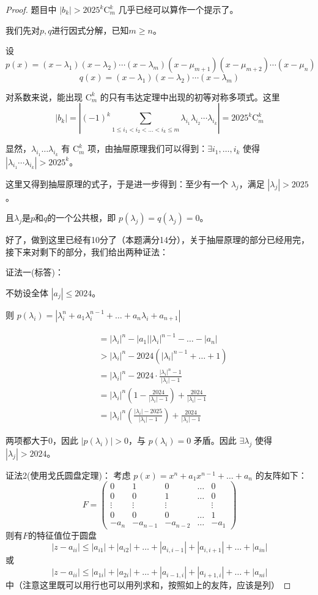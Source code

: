 \documentclass[12pt]{ctexart}  %
\begin{document}
\begin{proof}题目中 \(|b_k| > 2025^k \mathrm{C}_m^k\) 几乎已经可以算作一个提示了。

我们先对\(p,q\)进行因式分解，已知\(m \geq n\)。

设
\[
p(x) = (x-\lambda_1)(x-\lambda_2)\cdots(x-\lambda_m)(x-\mu_{m+1})(x-\mu_{m+2})\cdots(x-\mu_n)
\]
\[
q(x) = (x-\lambda_1)(x-\lambda_2)\cdots(x-\lambda_m)
\]

对系数来说，能出现 \(\mathrm{C}_m^k\) 的只有韦达定理中出现的初等对称多项式。这里
\[
|b_k| = \left|(-1)^k\sum_{1 \leq i_1 < i_2 < \dots < i_k \leq m} \lambda_{i_1}\lambda_{i_2}\cdots\lambda_{i_k}\right| = 2025^k \mathrm{C}_m^k
\]

显然，\(\lambda_{i_1} \dots \lambda_{i_k}\) 有 \(\mathrm{C}_m^k\) 项，由抽屉原理我们可以得到：\(\exists i_1,\dots,i_k\) 使得 \(|\lambda_{i_1}\cdots\lambda_{i_k}| > 2025^k\)。

这里又得到抽屉原理的式子，于是进一步得到：至少有一个 \(\lambda_j\)，满足 \(|\lambda_j| > 2025\)。

且\(\lambda_j\)是\(p\)和\(q\)的一个公共根，即 \(p(\lambda_j)=q(\lambda_j)=0\)。

好了，做到这里已经有10分了（本题满分14分），关于抽屉原理的部分已经用完，接下来对剩下的部分，我们给出两种证法：

证法一(标答)：

不妨设全体 \(|a_j| \leq 2024\)。

则 \(p(\lambda_i) = |\lambda_i^n + a_1\lambda_i^{n-1} + \dots + a_n\lambda_i + a_{n+1}|\)

\[
\begin{aligned}
&= |\lambda_i|^n - |a_1||\lambda_i|^{n-1} - \dots - |a_n| \\
&> |\lambda_i|^n - 2024 \left(|\lambda_i|^{n-1} + \dots + 1\right) \\
&= |\lambda_i|^n - 2024 \cdot \frac{|\lambda_i|^n - 1}{|\lambda_i| - 1} \\
&= |\lambda_i|^n \left(1 - \frac{2024}{|\lambda_i| - 1}\right) + \frac{2024}{|\lambda_i| - 1} \\
&= |\lambda_i|^n \left(\frac{|\lambda_i| - 2025}{|\lambda_i| - 1}\right) + \frac{2024}{|\lambda_i| - 1}
\end{aligned}
\]

两项都大于0，因此 \(|p(\lambda_i)| > 0\)，与 \(p(\lambda_i)=0\) 矛盾。因此 \(\exists \lambda_j\) 使得 \(|\lambda_j| > 2024\)。

证法2(使用戈氏圆盘定理)： 考虑 $p(x)=x^n+a_1x^{n-1}+\dots+a_n$ 的友阵如下：
\[
F = \begin{pmatrix}
0 & 1 & 0 & \dots & 0 \\
0 & 0 & 1 & \dots & 0 \\
\vdots & \vdots & \vdots & & \vdots \\
0 & 0 & 0 & \dots & 1 \\
-a_n & -a_{n-1} & -a_{n-2} & \dots & -a_1
\end{pmatrix}
\]
则有$F$的特征值位于圆盘
\[
|z - a_{ii}| \leq |a_{i1}| + |a_{i2}| + \dots + |a_{i,i-1}| + |a_{i,i+1}|+ \dots + |a_{in}|
\]
或
\[
|z - a_{ii}| \leq |a_{1i}| + |a_{2i}| + \dots + |a_{i-1,i}| + |a_{i+1,i}|+ \dots + |a_{ni}|
\]
中（注意这里既可以用行也可以用列求和，按照如上的友阵，应该是列）


\end{proof}
\end{document}

